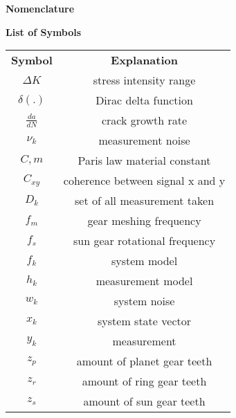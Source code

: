 \newpage
{\normalfont\LARGE\bfseries\Large Nomenclature}

{\bfseries List of Symbols}

\begin{center}
	\begin{tabular}{ c c}
		 {\bfseries Symbol} & {\bfseries Explanation } \\ [0.5ex]
		$\Delta K$ & stress intensity range\\
		$\delta(.)$ & Dirac delta function  \\ 
		$\frac{d a}{d N}$ & crack growth rate\\
		$\nu_k$ & measurement noise  \\ 
		$C, m$ & Paris law material constant \\
		$C_{x y}$ & coherence between signal x and y\\
		$D_k$ & set of all measurement taken\\
		$f_{m}$  & gear meshing frequency\\ 
		$f_{s}$ & sun gear rotational frequency\\
		$f_k$ & system model  \\ 
		$h_k$ & measurement model  \\ 
		$w_k$ & system noise  \\ 
		$x_k$ & system state vector  \\ 
		$y_k$ & measurement  \\ 
		$z_{p}$ & amount of planet gear teeth\\
		$z_{r}$  & amount of ring gear teeth\\
		$z_{s}$ & amount of sun gear teeth
	\end{tabular}
\end{center}



\newpage